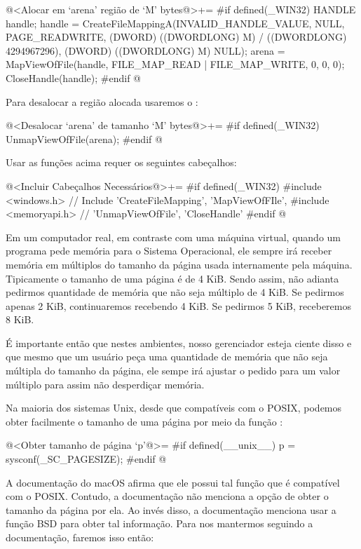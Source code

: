 \iniciocodigo
@<Alocar em `arena' região de `M' bytes@>+=
#if defined(_WIN32)
{
  HANDLE handle;
  handle = CreateFileMappingA(INVALID_HANDLE_VALUE, NULL,
                              PAGE_READWRITE,
                              (DWORD) ((DWORDLONG) M) / ((DWORDLONG) 4294967296),
                              (DWORD) ((DWORDLONG) M) %
                              NULL);
  arena = MapViewOfFile(handle, FILE_MAP_READ | FILE_MAP_WRITE, 0, 0, 0);
  CloseHandle(handle);
}
#endif
@
\fimcodigo

Para desalocar a região alocada usaremos o :

\iniciocodigo
@<Desalocar `arena' de tamanho `M' bytes@>+=
#if defined(_WIN32)
UnmapViewOfFile(arena);
#endif
@
\fimcodigo

Usar as funções acima requer os seguintes cabeçalhos:

\iniciocodigo
@<Incluir Cabeçalhos Necessários@>+=
#if defined(_WIN32)
#include <windows.h>  // Include 'CreateFileMapping', 'MapViewOfFIle',
#include <memoryapi.h> // 'UnmapViewOfFile', 'CloseHandle'
#endif
@
\fimcodigo


Em um computador real, em contraste com uma máquina virtual, quando um
programa pede memória para o Sistema Operacional, ele sempre irá
receber memória em múltiplos do tamanho da página usada internamente
pela máquina. Tipicamente o tamanho de uma página é de 4 KiB. Sendo
assim, não adianta pedirmos quantidade de memória que não seja
múltiplo de 4 KiB. Se pedirmos apenas 2 KiB, continuaremos recebendo 4
KiB. Se pedirmos 5 KiB, receberemos 8 KiB.

É importante então que nestes ambientes, nosso gerenciador esteja
ciente disso e que mesmo que um usuário peça uma quantidade de memória
que não seja múltipla do tamanho da página, ele sempe irá ajustar o
pedido para um valor múltiplo para assim não desperdiçar memória.

Na maioria dos sistemas Unix, desde que compatíveis com o POSIX,
podemos obter facilmente o tamanho de uma página por meio da
função :

\iniciocodigo
@<Obter tamanho de página `p'@>=
#if defined(__unix__)
p = sysconf(_SC_PAGESIZE);
#endif
@
\fimcodigo

A documentação do macOS afirma que ele possui tal função que é
compatível com o POSIX. Contudo, a documentação não menciona a opção
de obter o tamanho da página por ela. Ao invés disso, a documentação
menciona usar a função BSD  para obter tal
informação. Para nos mantermos seguindo a documentação, faremos isso
então:

